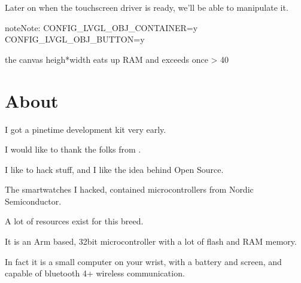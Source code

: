 \documentclass[letterpaper,10pt,english]{sphinxmanual}
\begin{document}
Later on when the touch\sphinxhyphen{}screen driver is ready, we’ll be able to manipulate it.

\begin{sphinxVerbatim}[commandchars=\\\{\}]
\end{sphinxVerbatim}

\begin{sphinxadmonition}{note}{Note:}
CONFIG\_LVGL\_OBJ\_CONTAINER=y
CONFIG\_LVGL\_OBJ\_BUTTON=y
\end{sphinxadmonition}

\begin{sphinxVerbatim}[commandchars=\\\{\}]

\end{sphinxVerbatim}

 the canvas heigh*width eats up RAM and exceeds once \textgreater{} 40


\chapter{About}
\label{\detokenize{about:about}}\label{\detokenize{about::doc}}
I got a pinetime development kit very early.

I would like to thank the folks from .

I like to hack stuff, and I like the idea behind Open Source.

The smartwatches I hacked, contained microcontrollers from Nordic Semiconductor.

A lot of resources exist for this breed.

It is an Arm based, 32bit microcontroller with a lot of flash and RAM memory.

In fact it is a small computer on your wrist, with a battery and screen, and capable of bluetooth 4+ wireless communication.

\begin{sphinxVerbatim}[commandchars=\\\{\}]
        
           
\end{sphinxVerbatim}
\end{document}
